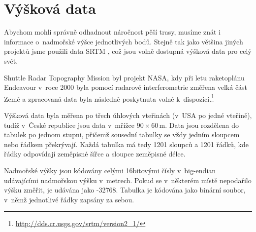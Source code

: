 \section{Výšková data}
Abychom mohli správně odhadnout náročnost pěší trasy, musíme znát i informace
o~nadmořské výšce jednotlivých bodů. Stejně tak jako většina jiných projektů jsme
použili data SRTM \cite{srtmweb}, což jsou volně dostupná výšková data pro celý
svět.

Shuttle Radar Topography Mission byl projekt NASA, kdy při letu raketoplánu
Endeavour v~roce 2000 byla pomocí radarové interferometrie změřena velká část
Země a zpracovaná data byla následně poskytnuta volně k~dispozici.\footnote{\url{http://dds.cr.usgs.gov/srtm/version2_1/}} 

Výšková data byla měřena po třech úhlových vteřinách (v~USA po jedné vteřině),
tudíž v~České republice jsou data v~mřížce $90\times60$\,m. Data jsou rozdělena
do tabulek po jednom stupni, přičemž sousední tabulky se vždy jedním sloupcem
nebo řádkem překrývají. Každá tabulka má tedy 1201 sloupců a 1201 řádků, kde
řádky odpovídají zeměpisné šířce a sloupce zeměpisné délce.

Nadmořské výšky jsou kódovány celými 16bitovými čísly v~big-endian udávajícími
nadmořskou výšku v~metrech. Pokud se v~některém místě nepodařilo výšku změřit,
je udávána jako -32768. Tabulka je kódována jako binární soubor, v~němž
jednotlivé řádky zapsány za sebou.
